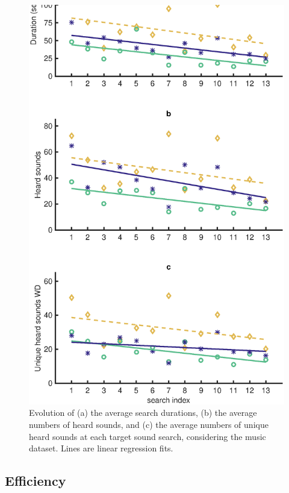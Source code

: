 \documentclass{aes2e}
\begin{document}
\begin{figure}[t]
\begin{center}
\includegraphics[width=\columnwidth]{gfx/analyse_music2.eps} 
\end{center}
\caption{\label{fig2Music} Evolution of (a) the average search durations, (b) the average numbers of heard sounds, and (c) the average numbers of unique heard sounds at each target sound search, considering the music dataset. Lines are linear regression fits.}
\end{figure}

\subsection{Efficiency}
\end{document}
